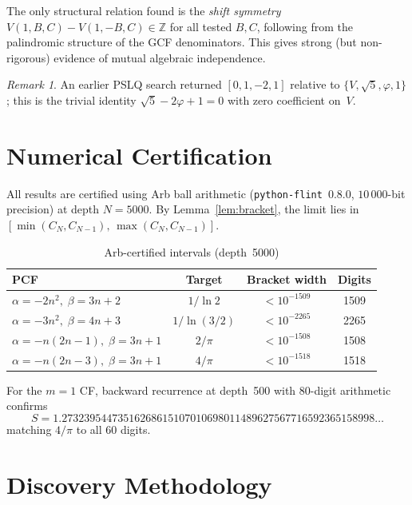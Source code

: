 \documentclass[11pt,a4paper]{article}
\theoremstyle{plain}
\theoremstyle{definition}
\theoremstyle{remark}
\newtheorem{remark}[theorem]{Remark}
\begin{document}
The only structural relation found is the \emph{shift symmetry}
$V(1,B,C) - V(1,-B,C) \in \mathbb{Z}$ for all tested $B, C$,
following from the palindromic structure of the GCF denominators.
This gives strong (but non-rigorous) evidence of mutual algebraic
independence.

\begin{remark}
An earlier PSLQ search returned $[0, 1, -2, 1]$ relative to
$\{V, \sqrt{5}, \varphi, 1\}$; this is the trivial identity
$\sqrt{5} - 2\varphi + 1 = 0$ with zero coefficient on~$V$.
\end{remark}

\section{Numerical Certification}\label{sec:cert}

All results are certified using Arb ball arithmetic
(\texttt{python-flint}~0.8.0, $10\,000$-bit precision)
at depth $N = 5000$.
By Lemma~\ref{lem:bracket}, the limit lies in
$[\min(C_N, C_{N-1}),\, \max(C_N, C_{N-1})]$.

\begin{table}[ht]
\centering
\caption{Arb-certified intervals (depth~5000)}\label{tab:cert}
\begin{tabular}{@{}lccc@{}}
\toprule
PCF & Target & Bracket width & Digits \\
\midrule
$\alpha{=}{-}2n^2,\;\beta{=}3n{+}2$
  & $1/\ln 2$    & $<10^{-1509}$ & 1509 \\
$\alpha{=}{-}3n^2,\;\beta{=}4n{+}3$
  & $1/\ln(3/2)$ & $<10^{-2265}$ & 2265 \\
$\alpha{=}{-}n(2n{-}1),\;\beta{=}3n{+}1$
  & $2/\pi$      & $<10^{-1508}$ & 1508 \\
$\alpha{=}{-}n(2n{-}3),\;\beta{=}3n{+}1$
  & $4/\pi$      & $<10^{-1518}$ & 1518 \\
\bottomrule
\end{tabular}
\end{table}

For the $m = 1$ CF, backward recurrence at depth~500 with
80-digit arithmetic confirms
\[
  S = 1.27323954473516268615107010698011489627567716592365158998\ldots
\]
matching $4/\pi$ to all 60 digits.

\section{Discovery Methodology}\label{sec:method}
\end{document}
